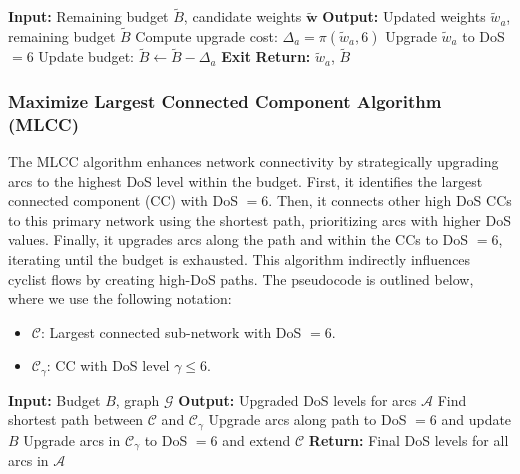 \documentclass[letterpaper, 10 pt, conference]{ieeeconf}  %
\begin{document}
\begin{algorithm}[H]
\caption{$GA$ Algorithm (used for \mbox{GA-U} and \mbox{GA-S})}
\label{pseudocode:GA}
\footnotesize
\begin{algorithmic}[1]
\State \textbf{Input:} Remaining budget $\tilde{B}$, candidate weights $\tilde{\mathbf{w}}$
\State \textbf{Output:} Updated weights $\tilde{w}_a$, remaining budget $\tilde{B}$
    \State Compute upgrade cost: $\Delta_a = \pi(\tilde{w}_a, 6)$
        \State Upgrade $\tilde{w}_a$ to DoS $=6$
        \State Update budget: $\tilde{B} \gets \tilde{B} - \Delta_a$
    \EndIf
     \textbf{Exit} \EndIf
\EndFor
\State \textbf{Return:} $\tilde{w}_a$, $\tilde{B}$
\end{algorithmic}
\end{algorithm}


\subsubsection{Maximize Largest Connected Component Algorithm (MLCC)}
The MLCC algorithm \cite{2024graphbased} enhances network connectivity by strategically upgrading arcs to the highest DoS level within the budget. First, it identifies the largest connected component (CC) with DoS $=6$. Then, it connects other high DoS CCs to this primary network using the shortest path, prioritizing arcs with higher DoS values. Finally, it upgrades arcs along the path and within the CCs to DoS $=6$, iterating until the budget is exhausted. This algorithm indirectly influences cyclist flows by creating high-DoS paths. The pseudocode is outlined below, where we use the following notation:
\begin{itemize}
    \item $\mathcal{C}$: Largest connected sub-network with DoS $=6$.
    \item $\mathcal{C}_{\gamma}$: CC with DoS level $\gamma \leq 6$.
\end{itemize}

\begin{algorithm}[H]
\caption{MLCC Algorithm}
\label{pseudocode:MLCC}
\footnotesize
\begin{algorithmic}[1]
\State \textbf{Input:} Budget $B$, graph $\mathcal{G}$
\State \textbf{Output:} Upgraded DoS levels for arcs $\mathcal{A}$
    \State Find shortest path between $\mathcal{C}$ and $\mathcal{C}_{\gamma}$
    \State Upgrade arcs along path to DoS $=6$ and update $B$
    \State Upgrade arcs in $\mathcal{C}_{\gamma}$ to DoS $=6$ and extend $\mathcal{C}$
\EndWhile
\State \textbf{Return:} Final DoS levels for all arcs in $\mathcal{A}$
\end{algorithmic}
\end{algorithm}
\end{document}

